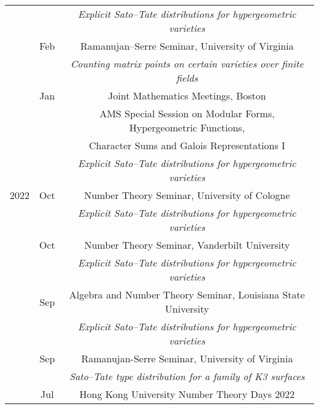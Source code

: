\documentclass[11pt]{amsart}
\theoremstyle{remark}
\begin{document}
{\begin{tabular}{ c c c }
     &      & \hspace{-1.5in}\textit{Explicit Sato--Tate distributions for hypergeometric varieties} \\
     & Feb  & \hspace{-2.3in} Ramanujan--Serre Seminar, University of Virginia \\
     &      & \hspace{-1.5in}\textit{Counting matrix points on certain varieties over finite fields} \\
     &  Jan & \hspace{-3.13in}Joint Mathematics Meetings, Boston \\
     &      & \hspace{-0.9in}AMS Special Session on Modular Forms, Hypergeometric Functions, \\
     &      & \hspace{-2.5in}Character Sums and Galois Representations I\\
     &      &  \hspace{-1.5in}\textit{Explicit Sato--Tate distributions for hypergeometric varieties} \\
2022 &  Oct & \hspace{-2.38in}Number Theory Seminar, University of Cologne \\
     &      &  \hspace{-1.5in}\textit{Explicit Sato--Tate distributions for hypergeometric varieties} \\
     &  Oct & \hspace{-2.38in}Number Theory Seminar, Vanderbilt University \\
     &      &  \hspace{-1.5in}\textit{Explicit Sato--Tate distributions for hypergeometric varieties} \\
     & Sep  & \hspace{-1.15in} Algebra and Number Theory Seminar, Louisiana State University \\
     &      & \hspace{-1.5in}\textit{Explicit Sato--Tate distributions for hypergeometric varieties} \\
     & Sep  & \hspace{-2.3in}Ramanujan-Serre Seminar, University of Virginia \\
     &      & \hspace{-1.9in}\textit{Sato--Tate type distribution for a family of K3 surfaces} \\
     & Jul  & \hspace{-2.2in}Hong Kong University Number Theory Days 2022 \\

\end{tabular}}
\end{document}
